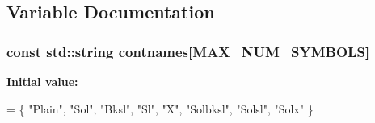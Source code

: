 \subsection{Variable Documentation}
\hypertarget{a00211_ab667dd50e9a4ca23ede569ad1de36188}{
\subsubsection[{contnames}]{\setlength{\rightskip}{0pt plus 5cm}const std\-::string contnames\mbox{[}{\bf M\-A\-X\-\_\-\-N\-U\-M\-\_\-\-S\-Y\-M\-B\-O\-L\-S}\mbox{]}}}\label{a00211_ab667dd50e9a4ca23ede569ad1de36188}
{\bfseries Initial value\-:}
\begin{DoxyCode}
=
\{
    \textcolor{stringliteral}{"Plain"},
    \textcolor{stringliteral}{"Sol"},
    \textcolor{stringliteral}{"Bksl"},
    \textcolor{stringliteral}{"Sl"},
    \textcolor{stringliteral}{"X"},
    \textcolor{stringliteral}{"Solbksl"},
    \textcolor{stringliteral}{"Solsl"},
    \textcolor{stringliteral}{"Solx"}
\}
\end{DoxyCode}
